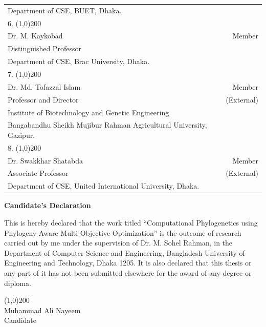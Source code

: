\begin{singlespace}
{\begin{spacing}{0.5}
\begin{tabular}{p{12cm} r }
	Department of CSE, BUET, Dhaka.  & \\
 	\vspace{0.1cm}
 	6. \line(1,0){200} &  \\
 	Dr. M. Kaykobad  & Member\\ 
 	Distinguished Professor & \\
 	Department of CSE, Brac University, Dhaka.  & \\
 	\vspace{0.1cm}
 	7. \line(1,0){200} &  \\
 	Dr. Md. Tofazzal Islam & Member\\ 
 	Professor and Director  & (External)\\
 	Institute of Biotechnology and Genetic Engineering & \\ 
 	Bangabandhu Sheikh Mujibur Rahman Agricultural University, Gazipur. & \\
 	\vspace{0.1cm}
 	8. \line(1,0){200} &  \\
 	Dr. Swakkhar Shatabda & Member\\ 
 	Associate Professor  & (External)\\
 	Department of CSE, United International University, Dhaka. & \\
 \end{tabular}
 \end{spacing}
}
\end{singlespace}
 \newpage
 \begin{center}
 \LARGE \textbf{Candidate's Declaration}
 \end{center}
 \vspace{3cm}
 This is hereby declared that the work titled ``Computational Phylogenetics using Phylogeny-Aware Multi-Objective Optimization'' is the outcome of research carried out by me under the supervision of Dr. M. Sohel Rahman, in the Department of Computer Science and Engineering,
 Bangladesh University of Engineering and Technology, Dhaka 1205. 
 It is also declared that this thesis or any part of it has not been submitted elsewhere for the award of any degree or diploma. \\
 \vspace{4cm}
\begin{center}
 \line(1,0){200}\\
 \large
 Muhammad Ali Nayeem \\
 Candidate
\end{center}
 

 
 
 